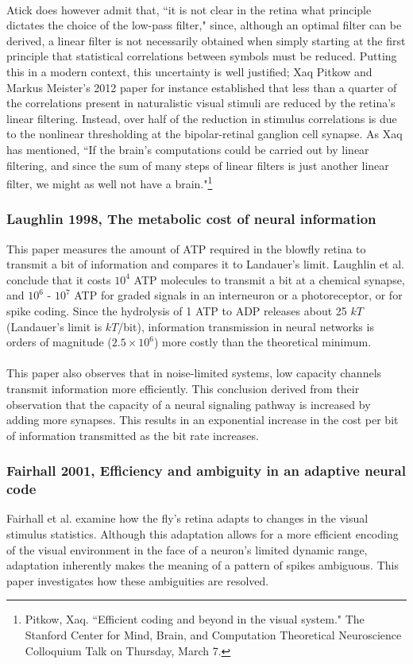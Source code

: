 \documentclass{article}
\begin{document}
\\
Atick does however admit that, ``it is not clear in the retina what principle dictates the choice of the low-pass filter," since, although an optimal filter can be derived, a linear filter is not necessarily obtained when simply starting at the first principle that statistical correlations between symbols must be reduced.  Putting this in a modern context, this uncertainty is well justified; Xaq Pitkow and Markus Meister's 2012 paper for instance established that less than a quarter of the correlations present in naturalistic visual stimuli are reduced by the retina's linear filtering.  Instead, over half of the reduction in stimulus correlations is due to the nonlinear thresholding at the bipolar-retinal ganglion cell synapse.  As Xaq has mentioned, ``If the brain's computations could be carried out by linear filtering, and since the sum of many steps of linear filters is just another linear filter, we might as well not have a brain."\footnote{Pitkow, Xaq.  ``Efficient coding and beyond in the visual system."  The Stanford Center for Mind, Brain, and Computation Theoretical Neuroscience Colloquium Talk on Thursday, March 7.}



\subsubsection{Laughlin 1998, The metabolic cost of neural information}
This paper measures the amount of ATP required in the blowfly retina to transmit a bit of information and compares it to Landauer's limit.  Laughlin et al. conclude that it costs $10^4$ ATP molecules to transmit a bit at a chemical synapse, and $10^6$ - $10^7$ ATP for graded signals in an interneuron or a photoreceptor, or for spike coding.  Since the hydrolysis of 1 ATP to ADP releases about 25 $kT$ (Landauer's limit is $kT$/bit), information transmission in neural networks is orders of magnitude ($2.5 \times 10^6$) more costly than the theoretical minimum.\\
\\
This paper also observes that in noise-limited systems, low capacity channels transmit information more efficiently.  This conclusion derived from their observation that the capacity of a neural signaling pathway is increased by adding more synapses.  This results in an exponential increase in the cost per bit of information transmitted as the bit rate increases.


\subsubsection{Fairhall 2001, Efficiency and ambiguity in an adaptive neural code}
Fairhall et al. examine how the fly's retina adapts to changes in the visual stimulus statistics.  Although this adaptation allows for a more efficient encoding of the visual environment in the face of a neuron's limited dynamic range, adaptation inherently makes the meaning of a pattern of spikes ambiguous.  This paper investigates how these ambiguities are resolved.
\end{document}

